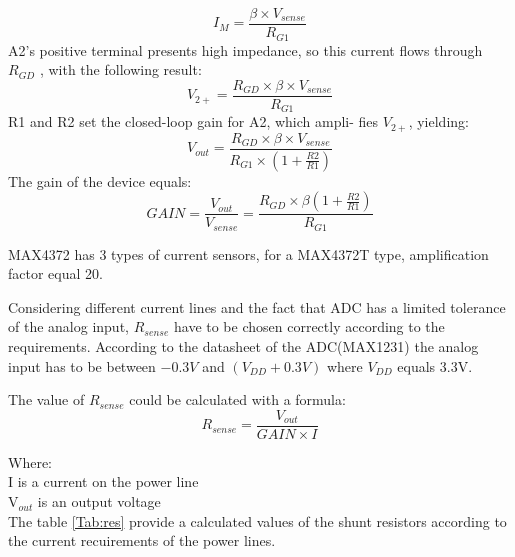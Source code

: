  \begin{equation}
I_{M} = \frac{\beta \times V_{sense}}{R_{G1}}
 \end{equation}
 A2’s positive terminal presents high impedance, so this
 current flows through $R_{GD}$ , with the following result:
  \begin{equation}
V_{2+} = \frac{R_{GD} \times \beta \times V_{sense}}{R_{G1}}
  \end{equation}
  R1 and R2 set the closed-loop gain for A2, which ampli-
  fies $V_{2+}$, yielding:
  \begin{equation}
  V_{out} = \frac{R_{GD} \times \beta \times V_{sense}}{R_{G1} \times (1+\frac{R2}{R1})	 }
  \end{equation}
The gain of the device equals:
  \begin{equation}
  GAIN =\frac{V_{out}}{V_{sense}} = \frac{R_{GD} \times \beta (1+\frac{R2}{R1})}{R_{G1}}
  \end{equation}
  
  MAX4372 has 3 types of current sensors, for a MAX4372T type, amplification factor equal 20.
  
  Considering different current lines and the fact that ADC has a limited tolerance of the analog input, $R_{sense}$ have to be chosen correctly according to the requirements. According to the datasheet of the ADC(MAX1231) the analog input has to be between $ -0.3V$ and $(V_{DD} + 0.3V)$ where $V_{DD}$ equals 3.3V.
  
  The value of $R_{sense}$ could be calculated with a formula:
    \begin{equation}
    R_{sense} = \frac{V_{out}}{GAIN \times I}
    \end{equation}
  
  Where:\\
  I is a current on the power line\\
  V$_{out}$ is an output voltage\\ 
 
 The table \ref{Tab:res} provide a calculated values of the shunt resistors according to the current recuirements of the power lines.
  

